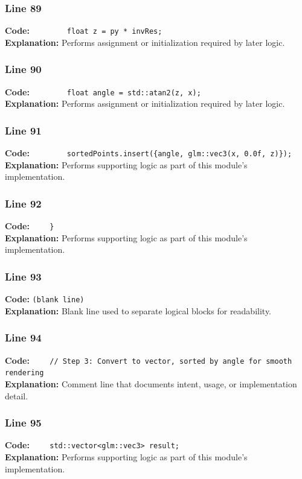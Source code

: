 \documentclass[11pt,a4paper]{article}
\begin{document}
\subsubsection*{Line 89}
\textbf{Code:} \verb|        float z = py * invRes;|\\
\textbf{Explanation:} Performs assignment or initialization required by later logic.

\subsubsection*{Line 90}
\textbf{Code:} \verb|        float angle = std::atan2(z, x);|\\
\textbf{Explanation:} Performs assignment or initialization required by later logic.

\subsubsection*{Line 91}
\textbf{Code:} \verb|        sortedPoints.insert({angle, glm::vec3(x, 0.0f, z)});|\\
\textbf{Explanation:} Performs supporting logic as part of this module's implementation.

\subsubsection*{Line 92}
\textbf{Code:} \verb|    }|\\
\textbf{Explanation:} Performs supporting logic as part of this module's implementation.

\subsubsection*{Line 93}
\textbf{Code:} \texttt{(blank line)}\\
\textbf{Explanation:} Blank line used to separate logical blocks for readability.

\subsubsection*{Line 94}
\textbf{Code:} \verb|    // Step 3: Convert to vector, sorted by angle for smooth rendering|\\
\textbf{Explanation:} Comment line that documents intent, usage, or implementation detail.

\subsubsection*{Line 95}
\textbf{Code:} \verb|    std::vector<glm::vec3> result;|\\
\textbf{Explanation:} Performs supporting logic as part of this module's implementation.
\end{document}
